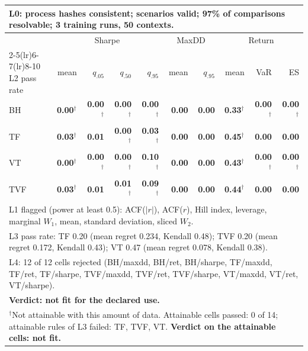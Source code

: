 \begin{tabular}{lrrrrrrrrr}
\toprule
\multicolumn{10}{p{13.5cm}}{L0: process hashes consistent; scenarios valid; 97\% of comparisons resolvable; 3 training runs, 50 contexts.} \\
\midrule
 & \multicolumn{4}{c}{Sharpe} & \multicolumn{2}{c}{MaxDD} & \multicolumn{3}{c}{Return} \\
\cmidrule(lr){2-5}\cmidrule(lr){6-7}\cmidrule(lr){8-10}
L2 pass rate & mean & $q_{.05}$ & $q_{.50}$ & $q_{.95}$ & mean & $q_{.95}$ & mean & VaR & ES \\
\midrule
BH & \textbf{0.00}$^{\dagger}$ & \textbf{0.00}$^{\dagger}$ & \textbf{0.00}$^{\dagger}$ & \textbf{0.00}$^{\dagger}$ & \textbf{0.00} & \textbf{0.00} & \textbf{0.33}$^{\dagger}$ & \textbf{0.00}$^{\dagger}$ & \textbf{0.00}$^{\dagger}$ \\
TF & \textbf{0.03}$^{\dagger}$ & \textbf{0.01} & \textbf{0.00}$^{\dagger}$ & \textbf{0.03}$^{\dagger}$ & \textbf{0.00} & \textbf{0.00} & \textbf{0.45}$^{\dagger}$ & \textbf{0.00} & \textbf{0.00} \\
VT & \textbf{0.00}$^{\dagger}$ & \textbf{0.00}$^{\dagger}$ & \textbf{0.00}$^{\dagger}$ & \textbf{0.10}$^{\dagger}$ & \textbf{0.00} & \textbf{0.00} & \textbf{0.43}$^{\dagger}$ & \textbf{0.00}$^{\dagger}$ & \textbf{0.00}$^{\dagger}$ \\
TVF & \textbf{0.03}$^{\dagger}$ & \textbf{0.01} & \textbf{0.01}$^{\dagger}$ & \textbf{0.09}$^{\dagger}$ & \textbf{0.00} & \textbf{0.00} & \textbf{0.44}$^{\dagger}$ & \textbf{0.00} & \textbf{0.00} \\
\midrule
\multicolumn{10}{p{13.5cm}}{L1 flagged (power at least 0.5): ACF($|r|$), ACF($r$), Hill index, leverage, marginal $W_1$, mean, standard deviation, sliced $W_2$.} \\
\multicolumn{10}{p{13.5cm}}{L3 pass rate: TF 0.20 (mean regret 0.234, Kendall 0.48); TVF 0.20 (mean regret 0.172, Kendall 0.43); VT 0.47 (mean regret 0.078, Kendall 0.38).} \\
\multicolumn{10}{p{13.5cm}}{L4: 12 of 12 cells rejected (BH/maxdd, BH/ret, BH/sharpe, TF/maxdd, TF/ret, TF/sharpe, TVF/maxdd, TVF/ret, TVF/sharpe, VT/maxdd, VT/ret, VT/sharpe).} \\
\multicolumn{10}{p{13.5cm}}{\textbf{Verdict: not fit for the declared use.}} \\
\multicolumn{10}{p{13.5cm}}{$^{\dagger}$Not attainable with this amount of data. Attainable cells passed: 0 of 14; attainable rules of L3 failed: TF, TVF, VT. \textbf{Verdict on the attainable cells: not fit.}} \\
\bottomrule
\end{tabular}
